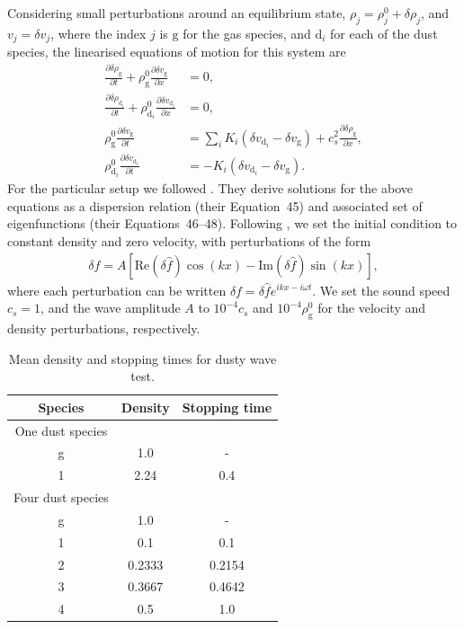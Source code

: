 \documentclass[fleqn,usenatbib]{mnras}
\newcommand{\g}{\mathrm{g}}
\newcommand{\dd}{\mathrm{d}}
\begin{document}
Considering small perturbations around an equilibrium state, \(\rho_j = \rho_j^0
+ \delta \rho_j\), and \(v_j = \delta v_j\), where the index \(j\) is \(\g\) for
the gas species, and \(\dd_i\) for each of the dust species, the linearised
equations of motion for this system are
%
\begin{align}
   \frac{\partial \delta \rho_{\g}}{\partial t}
      + \rho_{\g}^0 \frac{\partial \delta v_{\g}}{\partial x} &= 0, \\
   \frac{\partial \delta \rho_{\dd_i}}{\partial t}
      + \rho_{\dd_i}^0 \frac{\partial \delta v_{\dd_i}}{\partial x} &= 0, \\
   \rho_{\g}^0 \frac{\partial \delta v_{\g}}{\partial t}
      &= \sum_i K_i \left(\delta v_{\dd_i} - \delta v_{\g} \right)
         + c_s^2 \frac{\partial \delta \rho_{\g}}{\partial x}, \\
   \rho_{\dd_i}^0 \frac{\partial \delta v_{\dd_i}}{\partial t}
      &= - K_i \left(\delta v_{\dd_i} - \delta v_{\g}\right).
\end{align}
%
For the particular setup we followed \citet{Benitez-Llambay2019ApJS..241...25B}.
They derive solutions for the above equations as a dispersion relation (their
Equation~45) and associated set of eigenfunctions (their Equations~46--48).
Following \citet{Benitez-Llambay2019ApJS..241...25B}, we set the initial
condition to constant density and zero velocity, with perturbations of the form
%
\begin{align}
   \delta f = A \left[\mathrm{Re} \left(\delta \hat{f} \right) \cos(kx)
      - \mathrm{Im} \left(\delta \hat{f} \right) \sin(kx) \right],
\end{align}
%
where each perturbation can be written \(\delta f = \delta \hat{f} e^{ikx -
i\omega t}\). We set the sound speed \(c_s = 1\), and the wave amplitude \(A\)
to \(10^{-4} c_s\) and \(10^{-4} \rho_{\g}^0\) for the velocity and density
perturbations, respectively.

\begin{table}
   \centering
   \begin{tabular}{ccc}
      \hline
      \hline
      Species & Density & Stopping time \\
      \hline
      \hline
      One dust species \\
      g & 1.0 & - \\
      1 & 2.24 & 0.4 \\
      \hline
      Four dust species \\
      g & 1.0 & - \\
      1 & 0.1 & 0.1 \\
      2 & 0.2333 & 0.2154 \\
      3 & 0.3667 & 0.4642 \\
      4 & 0.5 & 1.0 \\
      \hline
      \hline
   \end{tabular}
   \caption{Mean density and stopping times for dusty wave test.}%
   \label{tab:wave}
\end{table}
\end{document}
